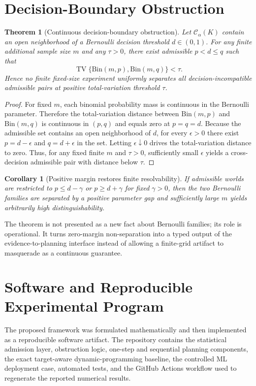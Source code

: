 \documentclass[11pt]{article}
\newtheorem{theorem}{Theorem}
\newtheorem{corollary}{Corollary}
\newcommand{\CalC}{\mathcal{C}}
\newcommand{\TV}{\operatorname{TV}}
\begin{document}
\section{Decision-Boundary Obstruction}
\begin{theorem}[Continuous decision-boundary obstruction]
\label{thm:obstruction}
Let $\CalC_\alpha(K)$ contain an open neighborhood of a Bernoulli decision threshold $d\in(0,1)$. For any finite additional sample size $m$ and any $\tau>0$, there exist admissible $p<d\le q$ such that
\[
\TV\{\mathrm{Bin}(m,p),\mathrm{Bin}(m,q)\}<\tau.
\]
Hence no finite fixed-size experiment uniformly separates all decision-incompatible admissible pairs at positive total-variation threshold $\tau$.
\end{theorem}
\begin{proof}
For fixed $m$, each binomial probability mass is continuous in the Bernoulli parameter. Therefore the total-variation distance between $\mathrm{Bin}(m,p)$ and $\mathrm{Bin}(m,q)$ is continuous in $(p,q)$ and equals zero at $p=q=d$. Because the admissible set contains an open neighborhood of $d$, for every $\epsilon>0$ there exist $p=d-\epsilon$ and $q=d+\epsilon$ in the set. Letting $\epsilon\downarrow0$ drives the total-variation distance to zero. Thus, for any fixed finite $m$ and $\tau>0$, sufficiently small $\epsilon$ yields a cross-decision admissible pair with distance below $\tau$.
\end{proof}

\begin{corollary}[Positive margin restores finite resolvability]
If admissible worlds are restricted to $p\le d-\gamma$ or $p\ge d+\gamma$ for fixed $\gamma>0$, then the two Bernoulli families are separated by a positive parameter gap and sufficiently large $m$ yields arbitrarily high distinguishability.
\end{corollary}

The theorem is not presented as a new fact about Bernoulli families; its role is operational. It turns zero-margin non-separation into a typed output of the evidence-to-planning interface instead of allowing a finite-grid artifact to masquerade as a continuous guarantee.

\section{Software and Reproducible Experimental Program}
The proposed framework was formulated mathematically and then implemented as a reproducible software artifact. The repository contains the statistical admission layer, obstruction logic, one-step and sequential planning components, the exact target-aware dynamic-programming baseline, the controlled ML deployment case, automated tests, and the GitHub Actions workflow used to regenerate the reported numerical results.
\end{document}
